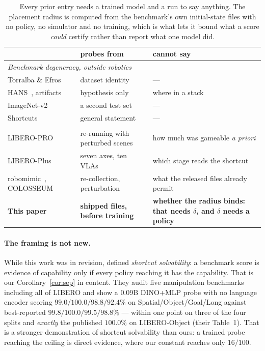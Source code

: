 \documentclass[10pt,twocolumn]{article}
\begin{document}
\begin{table}[t]\centering\footnotesize
\setlength{\tabcolsep}{3.5pt}
\begin{tabular}{p{2.35cm}p{2.5cm}p{2.65cm}}
\toprule
& probes from & cannot say \\
\midrule
\multicolumn{3}{l}{\emph{Benchmark degeneracy, outside robotics}} \\
Torralba \& Efros~\citep{torralba2011bias} & dataset identity & --- \\
HANS~\citep{mccoy2019hans}, artifacts~\citep{gururangan2018artifacts} & hypothesis only & where in a stack \\
ImageNet-v2~\citep{recht2019imagenet} & a second test set & --- \\
Shortcuts~\citep{geirhos2020shortcut} & general statement & --- \\
\addlinespace
\multicolumn{3}{l}{\emph{Perturbation, in robotics}} \\
LIBERO-PRO~\citep{zhou2025liberopro} & re-running with perturbed scenes & how much was gameable \emph{a priori} \\
LIBERO-Plus~\citep{fei2025liberoplus} & seven axes, ten VLAs & which stage reads the shortcut \\
robomimic~\citep{mandlekar2021robomimic}, COLOSSEUM~\citep{pumacay2024colosseum} & re-collection, perturbation & what the released files already permit \\
\addlinespace
\textbf{This paper} & \textbf{shipped files, before training} &
\textbf{whether the radius binds: that needs $\delta$, and $\delta$ needs a
policy} \\
\bottomrule
\end{tabular}
\caption{Every prior entry needs a trained model and a run to say anything.
The placement radius is computed from the benchmark's own initial-state files
with no policy, no simulator and no training, which is what lets it bound
what a score \emph{could} certify rather than report what one model did.}
\label{tab:related}
\end{table}

\paragraph{The framing is not new.} While this work was in revision,
\citet{jiang2026benchmarking} defined \emph{shortcut solvability}: a benchmark
score is evidence of capability only if every policy reaching it has the
capability. That is our Corollary~\ref{cor:sep} in content. They audit five
manipulation benchmarks including all of LIBERO and show a $0.09$B DINO+MLP
probe with no language encoder scoring $99.0/\mathbf{100.0}/98.8/92.4\%$ on
Spatial/Object/Goal/Long against best-reported $99.8/100.0/99.5/98.8\%$ --- within
one point on three of the four splits and \emph{exactly} the published
$100.0\%$ on LIBERO-Object (their Table~1). That is a stronger demonstration of
shortcut solvability than ours: a trained probe reaching the ceiling is direct
evidence, where our constant reaches only $16/100$.
\end{document}
